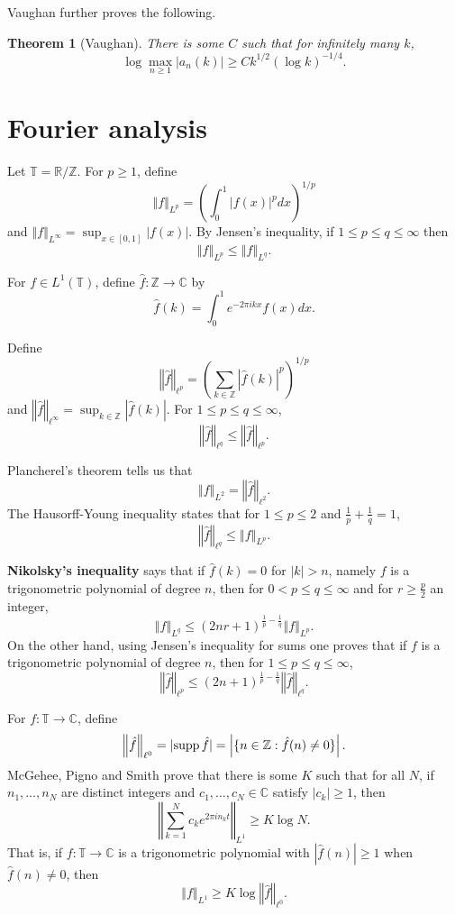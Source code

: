 \documentclass{amsart}
\newcommand{\supp}{\ensuremath\mathrm{supp}\,}
\newcommand{\norm}[1]{\left\Vert #1 \right\Vert}
\newtheorem{theorem}{Theorem}
\theoremstyle{definition}
\begin{document}
Vaughan further proves the following.

\begin{theorem}[Vaughan]
There is some $C$ such that for infinitely many $k$,
\[
\log \max_{n \geq 1} |a_n(k)| \geq C k^{1/2} (\log k)^{-1/4}.
\]
\end{theorem}






\section{Fourier analysis}
Let $\mathbb{T} = \mathbb{R} / \mathbb{Z}$.
For $p \geq 1$, define
\[
\norm{f}_{L^p} = \left( \int_0^1 |f(x)|^p dx \right)^{1/p}
\]
and $\norm{f}_{L^\infty} = \sup_{x \in [0,1]} |f(x)|$.
By Jensen's inequality,
if $1 \leq p \leq q \leq \infty$ then
\[
\norm{f}_{L^p} \leq \norm{f}_{L^q}.
\]

For $f \in L^1(\mathbb{T})$, define $\widehat{f}:\mathbb{Z} \to \mathbb{C}$ by
\[
\widehat{f}(k) = \int_0^1 e^{-2\pi i kx} f(x) dx.
\]

Define
\[
\norm{\widehat{f}}_{\ell^p} = \left( \sum_{k \in \mathbb{Z}} |\widehat{f}(k)|^p \right)^{1/p}
\]
and $\norm{\widehat{f}}_{\ell^\infty} = \sup_{k \in \mathbb{Z}} |\widehat{f}(k)|$.
For $1 \leq p \leq q \leq \infty$,
\[
\norm{\widehat{f}}_{\ell^q} \leq \norm{\widehat{f}}_{\ell^p}.
\]


Plancherel's theorem  tells us that
\[
\norm{f}_{L^2} = \norm{\widehat{f}}_{\ell^2}.
\]
 The Hausorff-Young inequality states that for $1 \leq p \leq 2$ and $\frac{1}{p}+\frac{1}{q}=1$,
 \[
 \norm{\widehat{f}}_{\ell^q} \leq \norm{f}_{L^p}.
 \]

\textbf{Nikolsky's inequality} \cite[p.~102, Theorem 2.6]{devore} says that if
$\widehat{f}(k) = 0$ for $|k|>n$, namely $f$ is a trigonometric polynomial of degree $n$, then 
for $0<p \leq q \leq \infty$ and for $r \geq \frac{p}{2}$ an integer,
\[
\norm{f}_{L^q} \leq (2nr+1)^{\frac{1}{p}-\frac{1}{q}} \norm{f}_{L^p}.
\]
On the other hand, using Jensen's inequality for sums one proves that if $f$ is a trigonometric polynomial of degree $n$, then for
 $1 \leq p \leq q \leq \infty$, 
 \[
 \norm{\widehat{f}}_{\ell^p} \leq (2n+1)^{\frac{1}{p}-\frac{1}{q}} \norm{\widehat{f}}_{\ell^q}.
 \]

For $f:\mathbb{T} \to \mathbb{C}$, define
\[
\norm{\hat{f}}_{\ell^0} =|\supp \hat{f}| =  \left| \{n \in \mathbb{Z}: \hat{f}(n) \neq 0\} \right|.
\]
McGehee, Pigno and Smith \cite{mcgehee} prove that there is some $K$ such that for all $N$, if
$n_1,\ldots,n_N$ are distinct integers and $c_1,\ldots,c_N \in \mathbb{C}$ satisfy $|c_k| \geq 1$, then
\[
\norm{\sum_{k=1}^N c_k e^{2\pi in_k t}}_{L^1} \geq K \log N.
\]
That is, if $f:\mathbb{T} \to \mathbb{C}$ is a trigonometric polynomial with $|\hat{f}(n)| \geq 1$ when $\hat{f}(n) \neq 0$, then
\[
\norm{f}_{L^1} \geq K \log \norm{\hat{f}}_{\ell^0}.
\]
\end{document}
